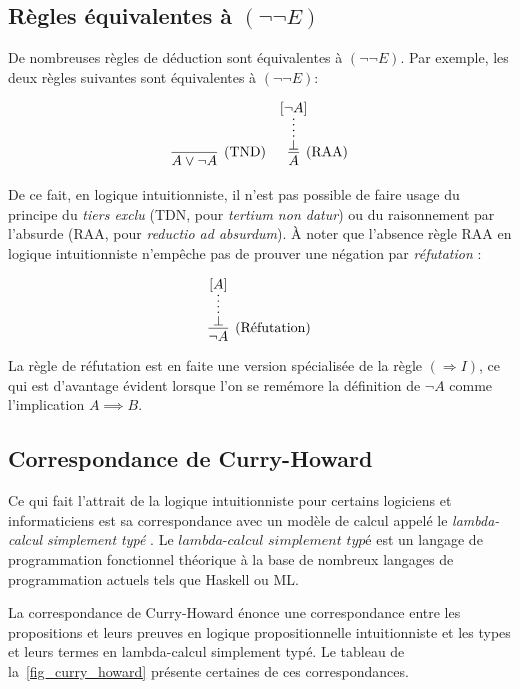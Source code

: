 \subsection{Règles équivalentes à $({\neg}{\neg}E)$}

De nombreuses règles de déduction sont équivalentes à $({\neg}{\neg}E)$. Par exemple, les deux règles suivantes sont équivalentes à $({\neg}{\neg}E)$:

\begin{align*}
\infer[(\text{TND})]{A \vee \neg A}{} &&
\infer[(\text{RAA})]{A}{\infer*{\bot}{[\neg A]}}
\end{align*}

De ce fait, en logique intuitionniste, il n'est pas possible de faire usage du principe du \textit{tiers exclu} (TDN, pour \textit{tertium non datur}) ou du raisonnement par l'absurde (RAA, pour \textit{reductio ad absurdum}). À noter que l'absence règle RAA en logique intuitionniste n'empêche pas de prouver une négation par \og \textit{réfutation} \fg{}:

\[
\infer[(\text{Réfutation})]{\neg A}{\infer*{\bot}{[A]}}
\]

La règle de réfutation est en faite une version spécialisée de la règle $({\Rightarrow}I)$, ce qui est d'avantage évident lorsque l'on se remémore la définition de $\neg A$ comme l'implication $A \implies B$.

\subsection{Correspondance de Curry-Howard}

Ce qui fait l'attrait de la logique intuitionniste pour certains logiciens et informaticiens est sa correspondance avec un modèle de calcul appelé le \og \textit{lambda-calcul simplement typé} \fg{}. Le $\textit{lambda-calcul simplement typé}$ est un langage de programmation fonctionnel théorique à la base de nombreux langages de programmation actuels tels que Haskell ou ML.

La correspondance de Curry-Howard énonce une correspondance entre les propositions et leurs preuves en logique propositionnelle intuitionniste et les types et leurs termes en lambda-calcul simplement typé. Le tableau de la~\cref{fig_curry_howard} présente certaines de ces correspondances.

